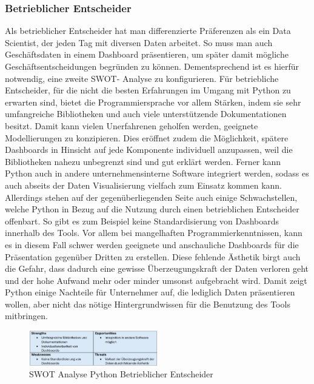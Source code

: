 \documentclass[12pt]{article}
\begin{document}
	\subsubsection{Betrieblicher Entscheider}
	
	Als betrieblicher Entscheider hat man differenzierte Präferenzen als ein Data Scientist,
	der jeden Tag mit diversen Daten arbeitet. So muss man auch Geschäftsdaten in einem
	Dashboard präsentieren, um später damit mögliche Geschäftsentscheidungen
	begründen zu können. Dementsprechend ist es hierfür notwendig, eine zweite SWOT-
	Analyse zu konfigurieren.
	Für betriebliche Entscheider, für die nicht die besten Erfahrungen im Umgang mit Python
	zu erwarten sind, bietet die Programmiersprache vor allem Stärken, indem sie sehr
	umfangreiche Bibliotheken und auch viele unterstützende Dokumentationen besitzt.
	Damit kann vielen Unerfahrenen geholfen werden, geeignete Modellierungen zu
	konzipieren. Dies eröffnet zudem die Möglichkeit, spätere Dashboards in Hinsicht auf
	jede Komponente individuell anzupassen, weil die Bibliotheken nahezu unbegrenzt sind
	und gut erklärt werden.
	Ferner kann Python auch in andere unternehmensinterne Software integriert werden,
	sodass es auch abseits der Daten Visualisierung vielfach zum Einsatz kommen kann.
	Allerdings stehen auf der gegenüberliegenden Seite auch einige Schwachstellen, welche
	Python in Bezug auf die Nutzung durch einen betrieblichen Entscheider offenbart.
	So gibt es zum Beispiel keine Standardisierung von Dashboards innerhalb des Tools. Vor
	allem bei mangelhaften Programmierkenntnissen, kann es in diesem Fall schwer
	werden geeignete und anschauliche Dashboards für die Präsentation gegenüber Dritten
	zu erstellen. Diese fehlende Ästhetik birgt auch die Gefahr, dass dadurch eine gewisse
	Überzeugungskraft der Daten verloren geht und der hohe Aufwand mehr oder minder
	umsonst aufgebracht wird.
	Damit zeigt Python einige Nachteile für Unternehmer auf, die lediglich Daten
	präsentieren wollen, aber nicht das nötige Hintergrundwissen für die Benutzung des
	Tools mitbringen.
	\begin{figure}[h]
		\centering
		\includegraphics[width=0.5\textwidth]{SWOT2}
		\caption{SWOT Analyse Python Betrieblicher Entscheider}
	\end{figure}
	
\end{document}
